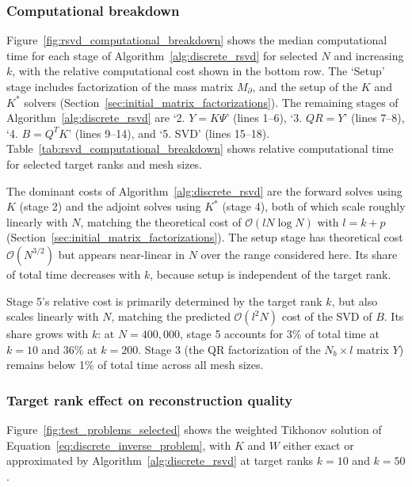 \subsubsection{Computational breakdown}\label{sec:computational_breakdown}


Figure~\ref{fig:rsvd_computational_breakdown} shows the median computational time for each stage of Algorithm~\ref{alg:discrete_rsvd} for selected $N$ and increasing $k$, with the relative computational cost shown in the bottom row. The `Setup' stage includes factorization of the mass matrix $M_\partial$, and the setup of the $K$ and $K^*$ solvers (Section~\ref{sec:initial_matrix_factorizations}). The remaining stages of Algorithm~\ref{alg:discrete_rsvd} are `2. $Y = K\Psi$' (lines 1--6), `3. $QR = Y$' (lines 7--8), `4. $B = Q^T K$' (lines 9--14), and `5. SVD' (lines 15--18). Table~\ref{tab:rsvd_computational_breakdown} shows relative computational time for selected target ranks and mesh sizes.

The dominant costs of Algorithm~\ref{alg:discrete_rsvd} are the forward solves using $K$ (stage 2) and the adjoint solves using $K^*$ (stage 4), both of which scale roughly linearly with $N$, matching the theoretical cost of $\mathcal{O}(l N \log N)$ with $l = k + p$ (Section~\ref{sec:initial_matrix_factorizations}). The setup stage has theoretical cost $\mathcal{O}(N^{3/2})$ but appears near-linear in $N$ over the range considered here. Its share of total time decreases with $k$, because setup is independent of the target rank.

Stage 5's relative cost is primarily determined by the target rank $k$, but also scales linearly with $N$, matching the predicted $\mathcal{O}(l^2 N)$ cost of the SVD of $B$. Its share grows with $k$: at $N = 400{,}000$, stage 5 accounts for 3\% of total time at $k = 10$ and 36\% at $k = 200$. Stage 3 (the QR factorization of the $N_b \times l$ matrix $Y$) remains below 1\% of total time across all mesh sizes.


\subsubsection{Target rank effect on reconstruction quality}\label{sec:target_rank_reconstruction}

Figure~\ref{fig:test_problems_selected} shows the weighted Tikhonov solution of Equation~\eqref{eq:discrete_inverse_problem}, with $K$ and $W$ either exact or approximated by Algorithm~\ref{alg:discrete_rsvd} at target ranks $k = 10$ and $k = 50$.

